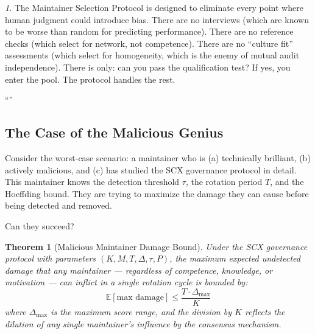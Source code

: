 \documentclass[12pt,a4paper]{article}
\newtheorem{theorem}{Theorem}[section]
\theoremstyle{remark}
\newcommand{\E}{\mathbb{E}}
\newtheorem{govnote}{}[section]
\newenvironment{govbox}{%
  \begin{center}
  \color{blue}
  \begin{minipage}{0.92\textwidth}
  \begin{govnote}
}{%
  \end{govnote}
  \end{minipage}
  \end{center}
}
\begin{document}
\begin{govbox}
The Maintainer Selection Protocol is designed to eliminate every point where
human judgment could introduce bias. There are no interviews (which are known
to be worse than random for predicting performance). There are no reference
checks (which select for network, not competence). There are no ``culture fit''
assessments (which select for homogeneity, which is the enemy of mutual audit
independence). There is only: can you pass the qualification test? If yes, you
enter the pool. The protocol handles the rest.

\begin{center}
\small\textbf{}

“”

\end{center}
\end{govbox}

\subsection{The Case of the Malicious Genius}

Consider the worst-case scenario: a maintainer who is (a) technically brilliant,
(b) actively malicious, and (c) has studied the SCX governance protocol in
detail. This maintainer knows the detection threshold $\tau$, the rotation
period $T$, and the Hoeffding bound. They are trying to maximize the damage
they can cause before being detected and removed.

Can they succeed?

\begin{theorem}[Malicious Maintainer Damage Bound]\label{thm:malicious}
Under the SCX governance protocol with parameters $(K, M, T, \Delta, \tau, P)$,
the maximum expected undetected damage that any maintainer — regardless of
competence, knowledge, or motivation — can inflict in a single rotation cycle
is bounded by:
\begin{equation}
    \E[\text{max damage}] \leq \frac{T \cdot \Delta_{\max}}{K}
\end{equation}
where $\Delta_{\max}$ is the maximum score range, and the division by $K$ reflects
the dilution of any single maintainer's influence by the consensus mechanism.
\end{theorem}
\end{document}
